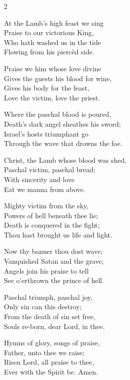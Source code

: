 \begin{multicols}{2}
\raggedcolumns
\begin{otherlanguage}{english}
At the Lamb’s high feast we sing\\
Praise to our victorious King,\\
Who hath washed us in the tide\\
Flowing from his piercèd side.

Praise we him whose love divine\\
Gives the guests his blood for wine,\\
Gives his body for the feast,\\
Love the victim, love the priest.

Where the paschal blood is poured,\\
Death’s dark angel sheathes his sword;\\
Israel’s hosts triumphant go\\
Through the wave that drowns the foe.

Christ, the Lamb whose blood was shed,\\
Paschal victim, paschal bread;\\
With sincerity and love\\
Eat we manna from above.

Mighty victim from the sky,\\
Powers of hell beneath thee lie;\\
Death is conquered in the fight;\\
Thou hast brought us life and light.

Now thy banner thou dost wave;\\
Vanquished Satan and the grave;\\
Angels join his praise to tell\\
See o’erthrown the prince of hell.

Paschal triumph, paschal joy,\\
Only sin can this destroy;\\
From the death of sin set free,\\
Souls re-born, dear Lord, in thee.

Hymns of glory, songs of praise,\\
Father, unto thee we raise;\\
Risen Lord, all praise to thee,\\
Ever with the Spirit be. Amen.

\end{otherlanguage}
\end{multicols}